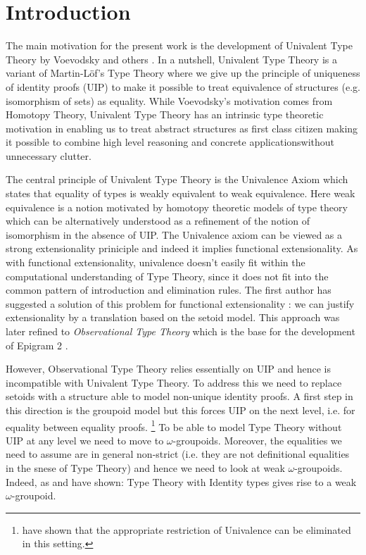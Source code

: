 \section{Introduction}

The main motivation for the present work is the development of
Univalent Type Theory by Voevodsky and others \cite{voevodsky}. In a
nutshell, Univalent Type Theory is a variant of Martin-L\"of's Type
Theory where we give up the principle of uniqueness of identity proofs
(UIP) to make it possible to treat equivalence of structures
(e.g. isomorphism of sets) as equality. While Voevodsky's motivation
comes from Homotopy Theory, Univalent Type Theory has an intrinsic
type theoretic motivation in enabling us to treat abstract structures
as first class citizen making it possible to combine high level
reasoning and concrete applicationswithout unnecessary clutter. 

The central principle of Univalent Type Theory is the Univalence Axiom
which states that equality of types is weakly equivalent to weak
equivalence. Here weak equivalence is a notion motivated by homotopy
theoretic models of type theory which can be alternatively understood
as a refinement of the notion of isomorphism in the absence of
UIP. The Univalence axiom can be viewed as a strong extensionality
priniciple and indeed it implies functional extensionality. As with
functional extensionality, univalence doesn't easily fit within the
computational understanding of Type Theory, since it does not fit into
the common pattern of introduction and elimination rules. The first
author has suggested a solution of this problem for functional
extensionality \cite{alti:lics99}: we can justify extensionality by a
translation based on the setoid model. This approach was later refined
\cite{plpv08} to \emph{Observational Type Theory} which is the base
for the development of Epigram 2 \cite{epigram2}.

However, Observational Type Theory relies essentially on UIP and hence
is incompatible with Univalent Type Theory. To address this we need to
replace setoids with a structure able to model non-unique identity
proofs. A first step in this direction is the groupoid model
\cite{HS:groupoid} but this forces UIP on the next level, i.e. for
equality between equality proofs. 
\footnote{\cite{HarperLicata} have shown that the appropriate
  restriction of Univalence can be eliminated in this setting.}
To be able to model Type Theory
without UIP at any level we need to move to
$\omega$-groupoids. Moreover, the equalities we need to assume are in
general non-strict (i.e. they are not definitional equalities in the
snese of Type Theory) and hence we need to look at weak
$\omega$-groupoids. Indeed, as \cite{garner} and \cite{lumsdaine} have
shown: Type Theory with Identity types gives rise to a weak
$\omega$-groupoid. 

